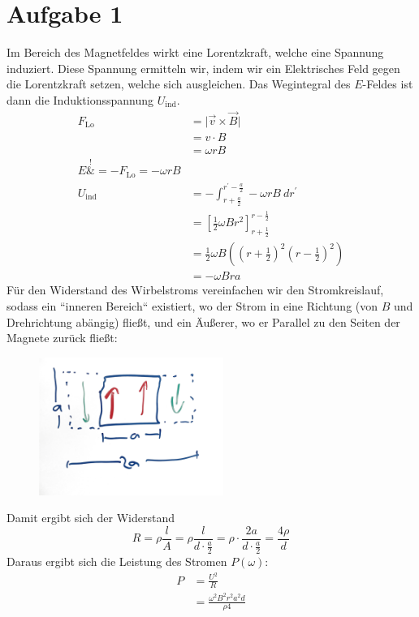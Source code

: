 \documentclass[11pt a4paper]{article}
\begin{document}
\thispagestyle{fancy}
\section*{Aufgabe 1}
Im Bereich des Magnetfeldes wirkt eine Lorentzkraft, welche eine Spannung induziert. Diese Spannung ermitteln wir, 
indem wir ein Elektrisches Feld gegen die Lorentzkraft setzen, welche sich ausgleichen. Das Wegintegral des
$E$-Feldes ist dann die Induktionsspannung $U_\text{ind}$.
\begin{align*}
	F_\text{Lo}
	&= \vert \vec v \times \vec B \vert \quad \\ 
	&= v \cdot B \\
	&= \omega r B \\
	E \overset{!}&{=} - F_\text{Lo} = -\omega r B \\
	U_\text{ind} 
	&= - \int_{r + \frac a2}^{r^\prime - \frac a2} -\omega rB \ dr^\prime \\
	&= \left[  \frac12 \omega B r^2 \right]_{r + \frac12}^{r - \frac12} \\
	&= \frac12 \omega B \left( \left( r + \frac12 \right)^2 \left( r - \frac12 \right)^2 \right) \\
	&= - \omega Bra
\end{align*}
Für den Widerstand des Wirbelstroms vereinfachen wir den Stromkreislauf, sodass ein ``inneren Bereich`` existiert,
wo der Strom in eine Richtung (von $B$ und Drehrichtung abängig) fließt, und ein Äußerer, wo er Parallel zu den
Seiten der Magnete zurück fließt:
\begin{figure}[H]
	\centering
	\includegraphics[width=6cm]{Aufgabe1.jpg}
\end{figure}
\noindent
Damit ergibt sich der Widerstand
\[ 
	R 
	= \rho \frac{l}{A} 
	= \rho \frac{l}{d \cdot \frac a2} 
	= \rho \cdot \frac{2a}{d \cdot \frac a2} 
	= \frac{4\rho}{d}
\]
Daraus ergibt sich die Leistung des Stromen $P(\omega)$:
\begin{align*}
	P 
	&= \frac{U^2}{R} \\
	&= \frac{\omega^2 B^2 r^2 a^2 d}{\rho 4}
\end{align*}
\end{document}
